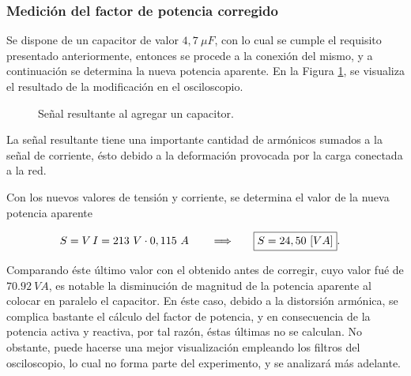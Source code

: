     \subsubsection{Medición del factor de potencia corregido}\label{subsubsec:Medicion del factor de potencia corregido}

          Se dispone de un capacitor de valor $4,7~\mu F$, con lo cual se cumple el requisito presentado
          anteriormente, entonces se procede a la conexión del mismo, y a continuación se determina la nueva potencia aparente. 
          En la Figura \ref{fig: Señal_Correccion}, se visualiza el resultado de la modificación en el osciloscopio.
        
        \begin{figure}[H]
          \centering
          \caption{Señal resultante al agregar un capacitor.}
          \label{fig: Señal_Correccion}
        \end{figure}

        La señal resultante tiene una importante cantidad de armónicos sumados a la señal de corriente, ésto debido
        a la deformación provocada por la carga conectada a la red.

         Con los nuevos valores de tensión y corriente, se determina el valor de la nueva potencia 
         aparente

        \begin{align*}
          S = V\,I  = 213~V \cdot 0,115\ A \hspace{20pt} \Longrightarrow \hspace{20pt} \Aboxed{S = 24,50 ~[VA]}.
        \end{align*}

        Comparando éste último valor con el obtenido antes de corregir, 
        cuyo valor fué de $70.92~VA$, es notable la disminución de magnitud 
        de la potencia aparente al colocar en paralelo el capacitor.
        En éste caso, debido a la distorsión armónica, se complica bastante el 
        cálculo del factor de potencia, y en consecuencia de la potencia 
        activa y reactiva, por tal razón, éstas últimas no se calculan. No obstante, puede hacerse una mejor visualización 
        empleando los filtros del osciloscopio, lo cual no forma parte del 
        experimento, y se analizará más adelante.



